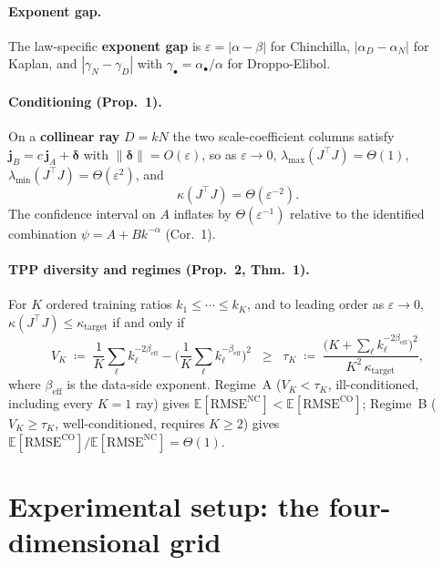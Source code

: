 \documentclass[11pt]{article}
\newcommand{\defn}[1]{\textbf{#1}}
\begin{document}
\paragraph{Exponent gap.} The law-specific \defn{exponent gap} is $\varepsilon=|\alpha-\beta|$ for Chinchilla,
$|\alpha_D-\alpha_N|$ for Kaplan, and $|\gamma_N-\gamma_D|$ with $\gamma_\bullet=\alpha_\bullet/
\alpha$ for Droppo-Elibol.

\paragraph{Conditioning (Prop.~1).} On a \defn{collinear ray} $D=kN$ the two scale-coefficient columns
satisfy $\mathbf j_B=c\,\mathbf j_A+\boldsymbol\delta$ with $\|\boldsymbol\delta\|=O(\varepsilon)$,
so as $\varepsilon\to0$, $\lambda_{\max}(J^\top J)=\Theta(1)$, $\lambda_{\min}(J^\top
J)=\Theta(\varepsilon^{2})$, and
\begin{equation}
  \kappa(J^\top J)=\Theta(\varepsilon^{-2}).
  \label{eq:prop1}
\end{equation}
The confidence interval on $A$ inflates by $\Theta(\varepsilon^{-1})$ relative to the identified
combination $\psi=A+Bk^{-\alpha}$ (Cor.~1).

\paragraph{TPP diversity and regimes (Prop.~2, Thm.~1).} For $K$ ordered training ratios
$k_1\le\cdots\le k_K$, and to leading order as $\varepsilon\to0$, $\kappa(J^\top J)\le
\kappa_{\mathrm{target}}$ if and only if
\begin{equation}
  V_K \;\coloneqq\; \frac1K\sum_{\ell}k_\ell^{-2\beta_{\mathrm{eff}}}
     -\Big(\frac1K\sum_\ell k_\ell^{-\beta_{\mathrm{eff}}}\Big)^2
  \;\;\ge\;\;
  \tau_K \;\coloneqq\;
  \frac{\big(K+\sum_\ell k_\ell^{-2\beta_{\mathrm{eff}}}\big)^2}{K^2\,\kappa_{\mathrm{target}}},
  \label{eq:prop2}
\end{equation}
where $\beta_{\mathrm{eff}}$ is the data-side exponent. Regime~A ($V_K<\tau_K$, ill-conditioned,
including every $K=1$ ray) gives $\mathbb E[\mathrm{RMSE}^{\mathrm{NC}}]<\mathbb
E[\mathrm{RMSE}^{\mathrm{CO}}]$; Regime~B ($V_K\ge\tau_K$, well-conditioned, requires $K\ge2$)
gives $\mathbb E[\mathrm{RMSE}^{\mathrm{CO}}]/\mathbb E[\mathrm{RMSE}^{\mathrm{NC}}]=\Theta(1)$.

\section{Experimental setup: the four-dimensional grid}
\label{sec:setup}
\end{document}
